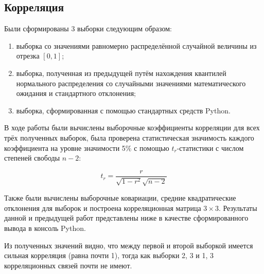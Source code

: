 \subsection{Корреляция}

Были сформированы 3 выборки следующим образом:

\begin{enumerate}
	\item выборка со значениями равномерно распределённой случайной величины из отрезка $[0, 1]$;
	\item выборка, полученная из предыдущей путём нахождения квантилей нормального распределения со случайными значениями математического ожидания и стандартного отклонения;
	\item выборка, сформированная с помощью стандартных средств Python.
\end{enumerate}

В ходе работы были вычислены выборочные коэффициенты корреляции для всех трёх полученных выборок, была проверена статистическая значимость каждого коэффициента на уровне значимости 5\% с помощью $t_r$-статистики с числом степеней свободы $n-2$:

\begin{equation}
	t_r = \frac{r}{\sqrt{1 - r^2} \sqrt{n - 2}}
\end{equation} 

Также были вычислены выборочные ковариации, средние квадратические отклонения для выборок и построена корреляционная матрица $3 \times 3$. Результаты данной и предыдущей работ представлены ниже в качестве сформированного вывода в консоль Python.

Из полученных значений видно, что между первой и второй выборкой имеется сильная корреляция (равна почти 1), тогда как выборки 2, 3 и 1, 3 корреляционных связей почти не имеют. 

